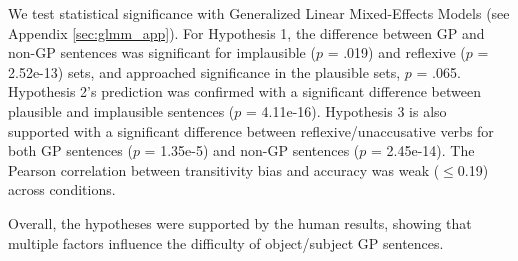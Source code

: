 
We test statistical significance with Generalized Linear Mixed-Effects Models (see Appendix \ref{sec:glmm_app}). For Hypothesis 1, the difference between GP and non-GP sentences was significant for implausible ($p$ = .019) and reflexive ($p$ = 2.52e-13) sets, and approached significance in the plausible sets, $p$ = .065. Hypothesis 2's prediction was confirmed with a significant difference between plausible and implausible sentences ($p$ = 4.11e-16). Hypothesis 3 is also supported with a significant difference between reflexive/unaccusative verbs for both GP sentences ($p$ = 1.35e-5) and non-GP sentences ($p$ = 2.45e-14). The Pearson correlation between transitivity bias and accuracy was weak ($\leq$0.19) across conditions. 


Overall, the hypotheses were supported by the human results, showing that multiple factors influence the difficulty of object/subject GP sentences.
